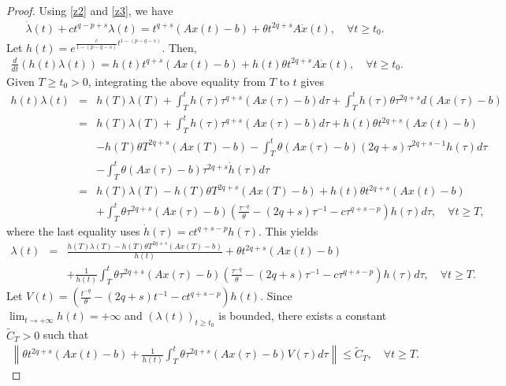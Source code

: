 \documentclass[review]{elsarticle}
\begin{document}
	\begin{proof}
		Using \eqref{z2} and \eqref{z3}, we have 	
		\begin{eqnarray*}
			\dot{\lambda}(t)+ct^{q-p+s}\lambda(t)=t^{q+s}(Ax(t)-b)+\theta t^{2q+s}A\dot{x}(t), \quad \forall t\geq t_0.
		\end{eqnarray*}	
		Let $h(t)=e^{\frac{c}{1-(p-q-s)}t^{1-(p-q-s)}}$. Then,
		\begin{eqnarray*}
			\frac{d}{dt}\left(h(t)\lambda(t)\right)=h(t)t^{q+s}(Ax(t)-b) +h(t)\theta t^{2q+s}A\dot{x}(t), \quad \forall t\geq t_0.
		\end{eqnarray*}	
		Given $T\geq t_0>0$, integrating the above equality from $T$ to $t$ gives
		\begin{eqnarray*}
			h(t)\lambda(t)&=&h(T)\lambda(T)+\int_{T}^{t}h(\tau)\tau^{q+s}(Ax(\tau)-b)d\tau+\int_{T}^{t}h(\tau)\theta \tau^{2q+s}d(Ax(\tau)-b)\\
			&=&h(T)\lambda(T)+\int_{T}^{t}h(\tau)\tau^{q+s}(Ax(\tau)-b)d\tau+h(t)\theta t^{2q+s}(Ax(t)-b)\\
			&&-h(T)\theta T^{2q+s}(Ax(T)-b)-\int_{T}^{t}\theta (Ax(\tau)-b)(2q+s)\tau^{2q+s-1}h(\tau)d\tau\\
			&&-\int_{T}^{t}\theta (Ax(\tau)-b)\tau^{2q+s}\dot{h}(\tau)d\tau\\
			&=&h(T)\lambda(T)-h(T)\theta T^{2q+s}(Ax(T)-b)+h(t)\theta t^{2q+s}(Ax(t)-b)\\
			&&+\int_{T}^{t}\theta \tau^{2q+s}(Ax(\tau)-b)\left(\frac{\tau^{-q}}{\theta}-(2q+s)\tau^{-1}-c\tau^{q+s-p}\right)h(\tau)d\tau, \quad \forall t\geq T,
		\end{eqnarray*}	
		where the last equality uses $\dot{h}(\tau)=ct^{q+s-p}h(\tau)$. This yields
		\begin{eqnarray*}
			\lambda(t)
			&=&\frac{h(T)\lambda(T)-h(T)\theta T^{2q+s}(Ax(T)-b)}{h(t)}+\theta t^{2q+s}(Ax(t)-b)\\
			&&+\frac{1}{h(t)}\int_{T}^{t}\theta \tau^{2q+s}(Ax(\tau)-b)\left(\frac{\tau^{-q}}{\theta}-(2q+s)\tau^{-1}-c\tau^{q+s-p}\right)h(\tau)d\tau, \quad \forall t\geq T.
		\end{eqnarray*}	
		Let $V(t)=\left(\frac{t^{-q}}{\theta}-(2q+s)t^{-1}-ct^{q+s-p}\right) h(t)$. Since $\lim_{t\rightarrow+\infty}h(t)=+\infty$ and $(\lambda(t))_{t\geq t_0}$ is bounded, there exists a constant $\widetilde{C}_{T}>0$ such that
		\begin{eqnarray*}
			\left\|\theta t^{2q+s}(Ax(t)-b)+\frac{1}{h(t)}\int_{T}^{t}\theta \tau^{2q+s}(Ax(\tau)-b)V(\tau)d\tau\right\|\leq\widetilde{C}_{T}, \quad \forall t\geq T.
		\end{eqnarray*}	
	\end{proof}
\end{document}
